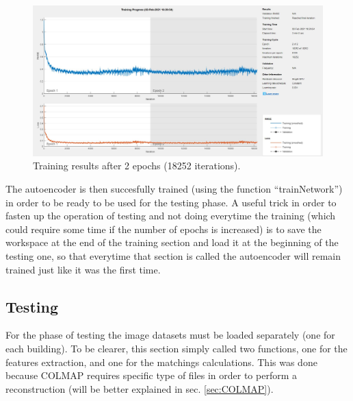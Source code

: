 \begin{figure}[H]
    \centering
    \includegraphics[width=\textwidth]{images/2EPOCHS.jpg}
    \caption{Training results after 2 epochs (18252 iterations).}
    \label{fig:2epochs}    
\end{figure}

The autoencoder is then succesfully trained (using the function ``trainNetwork'') in order to be ready to be used for the testing phase. A useful trick in order to fasten up the operation of testing and not doing everytime the training (which could require some time if the number of epochs is increased) is to save the workspace at the end of the training section and load it at the beginning of the testing one, so that everytime that section is called the autoencoder will remain trained just like it was the first time.

\subsection{Testing}
For the phase of testing the image datasets must be loaded separately (one for each building). To be clearer, this section simply called two functions, one for the features extraction, and one for the matchings calculations. This was done because COLMAP requires specific type of files in order to perform a reconstruction (will be better explained in sec. \ref{sec:COLMAP}).

